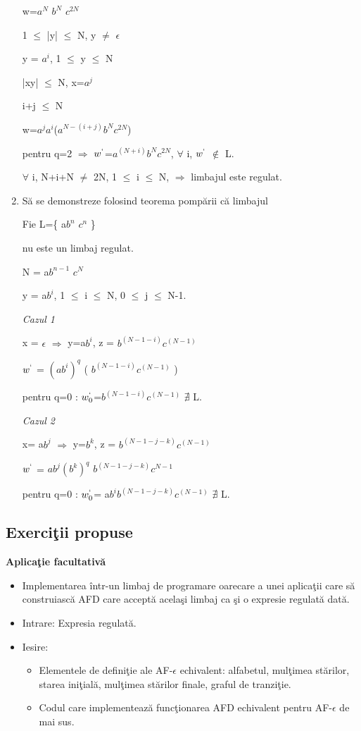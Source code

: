 \begin{enumerate}
w=$a^{N}$ $b^{N}$ $c^{2N}$

 1 $\leq$ |y| $\leq$ N, y $\neq$ $\epsilon$
 
 y = $a^{i}$,  1 $\leq$ y $\leq$ N
 
 |xy| $\leq$ N, x=$a^{j}$
  
i+j $\leq$ N

w=$a^{j}$$a^{i}$($a^{N-(i+j)}$$b^{N}$$c^{2N}$)

pentru q=2 $\Rightarrow$  $w^{`}$=$a^{(N+i)}$$b^{N}$$c^{2N}$, $\forall$ i,  $w^{`}$ $\notin$ L.

$\forall$ i, N+i+N $\neq$ 2N,  1 $\leq$ i $\leq$ N, $\Rightarrow$ limbajul este regulat.

\item
Să se demonstreze folosind teorema pompării că limbajul 

Fie L=\{ a$b^{n}$ $c^{n}$ \}

nu este un limbaj regulat.

N = a$b^{n-1}$ $c^{N}$

y = a$b^{i}$,  1 $\leq$ i $\leq$ N, 0 $\leq$ j $\leq$ N-1.

\textit{Cazul 1}  

x = $\epsilon$ $\Rightarrow$ y=a$b^{i}$, z = $b^{(N-1-i)}$$c^{(N-1)}$

$w^{`}$ = ${(ab^{i})}^{q}$ (  $b^{(N-1-i)}$$c^{(N-1)}$ )

pentru q=0 : $w_{0}^{`}$=$b^{(N-1-i)}$$c^{(N-1)}$ $\nexists$ L.

\textit{Cazul 2}

x= a$b^{j}$ $\Rightarrow$ y=$b^{k}$, z = $b^{(N-1-j-k)}$$c^{(N-1)}$
 
$w^{`}$ = $ab^{j}$${(b^{k})}^{q}$ $b^{(N-1-j-k)}$$c^{N-1}$
 
pentru q=0 : $w_{0}^{`}$= a$b^{i}$$b^{(N-1-j-k)}$$c^{(N-1)}$ $\nexists$ L.



\end{enumerate}

\subsection{Exerciţii propuse}

\textbf{Aplicaţie facultativă}
\begin{itemize}
\item
Implementarea într-un limbaj de programare oarecare a unei aplicaţii care să construiască AFD care acceptă acelaşi limbaj ca şi o expresie regulată dată.
\item
Intrare: Expresia regulată.
\item
Iesire:
\begin{itemize}
\item
Elementele de definiţie ale AF-$\epsilon$ echivalent: alfabetul, mulţimea stărilor, starea iniţială, mulţimea stărilor finale, graful de tranziţie.
\item
Codul care implementează funcţionarea AFD echivalent pentru AF-$\epsilon$ de mai sus.
\end{itemize}
\end{itemize}